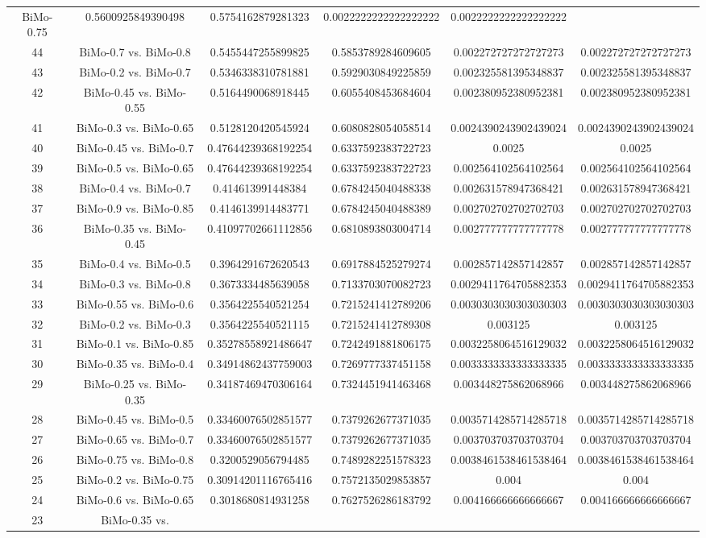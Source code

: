 \documentclass[a4paper,10pt]{article}
\begin{document}
\begin{landscape}
\begin{table}[!htp]
\begin{tabular}{cccccc}
BiMo-0.75&0.5600925849390498&0.5754162879281323&0.0022222222222222222&0.0022222222222222222\\44&BiMo-0.7 vs. BiMo-0.8&0.5455447255899825&0.5853789284609605&0.002272727272727273&0.002272727272727273\\43&BiMo-0.2 vs. BiMo-0.7&0.5346338310781881&0.5929030849225859&0.002325581395348837&0.002325581395348837\\42&BiMo-0.45 vs. BiMo-0.55&0.5164490068918445&0.6055408453684604&0.002380952380952381&0.002380952380952381\\41&BiMo-0.3 vs. BiMo-0.65&0.5128120420545924&0.6080828054058514&0.0024390243902439024&0.0024390243902439024\\40&BiMo-0.45 vs. BiMo-0.7&0.47644239368192254&0.6337592383722723&0.0025&0.0025\\39&BiMo-0.5 vs. BiMo-0.65&0.47644239368192254&0.6337592383722723&0.002564102564102564&0.002564102564102564\\38&BiMo-0.4 vs. BiMo-0.7&0.414613991448384&0.6784245040488338&0.002631578947368421&0.002631578947368421\\37&BiMo-0.9 vs. BiMo-0.85&0.4146139914483771&0.6784245040488389&0.002702702702702703&0.002702702702702703\\36&BiMo-0.35 vs. BiMo-0.45&0.41097702661112856&0.6810893803004714&0.002777777777777778&0.002777777777777778\\35&BiMo-0.4 vs. BiMo-0.5&0.3964291672620543&0.6917884525279274&0.002857142857142857&0.002857142857142857\\34&BiMo-0.3 vs. BiMo-0.8&0.3673334485639058&0.7133703070082723&0.0029411764705882353&0.0029411764705882353\\33&BiMo-0.55 vs. BiMo-0.6&0.3564225540521254&0.7215241412789206&0.0030303030303030303&0.0030303030303030303\\32&BiMo-0.2 vs. BiMo-0.3&0.3564225540521115&0.7215241412789308&0.003125&0.003125\\31&BiMo-0.1 vs. BiMo-0.85&0.35278558921486647&0.7242491881806175&0.0032258064516129032&0.0032258064516129032\\30&BiMo-0.35 vs. BiMo-0.4&0.34914862437759003&0.7269777337451158&0.0033333333333333335&0.0033333333333333335\\29&BiMo-0.25 vs. BiMo-0.35&0.34187469470306164&0.7324451941463468&0.003448275862068966&0.003448275862068966\\28&BiMo-0.45 vs. BiMo-0.5&0.33460076502851577&0.7379262677371035&0.0035714285714285718&0.0035714285714285718\\27&BiMo-0.65 vs. BiMo-0.7&0.33460076502851577&0.7379262677371035&0.003703703703703704&0.003703703703703704\\26&BiMo-0.75 vs. BiMo-0.8&0.3200529056794485&0.7489282251578323&0.0038461538461538464&0.0038461538461538464\\25&BiMo-0.2 vs. BiMo-0.75&0.30914201116765416&0.7572135029853857&0.004&0.004\\24&BiMo-0.6 vs. BiMo-0.65&0.3018680814931258&0.7627526286183792&0.004166666666666667&0.004166666666666667\\23&BiMo-0.35 vs. 
\end{tabular}
\end{table}
\end{landscape}
\end{document}
